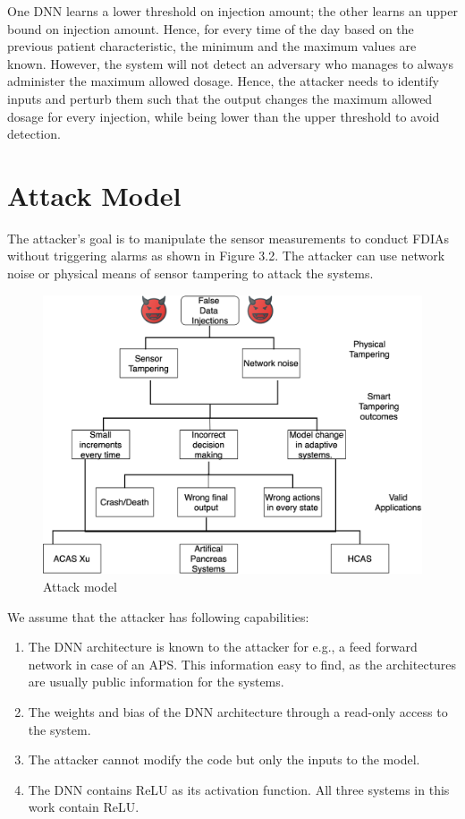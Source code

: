 One \ac{DNN} learns a lower threshold on injection amount; the other learns an upper bound on injection amount. 
Hence, for every time of the day based on the previous patient characteristic, the minimum and the maximum values are known. 
However, the system will not detect  an adversary  who manages to always administer the maximum allowed dosage.   
Hence, the attacker needs to identify inputs and  perturb them  such that the output changes the maximum  allowed dosage for every injection, 
  while being lower than the upper threshold to avoid detection. 


\section{Attack Model}
The attacker's goal is to manipulate the sensor measurements to conduct FDIAs without triggering alarms as shown in Figure 3.2. 
The attacker can use network noise or physical means of sensor tampering to attack the systems. 
 
\begin{figure}
	\centering
	\includegraphics[width=0.7\linewidth]{Images/Attackmodelphysical}
	\caption{Attack model}
	\label{fig:attackmodelphysical}
\end{figure}

We assume that the attacker has following capabilities:
\begin{enumerate}
	\item The \ac{DNN}  architecture  is known to the attacker for e.g., a feed forward  network in case of an \ac{APS}. This information easy to find, as the architectures are  usually public information for the systems. 
	\item  The weights and bias of the \ac{DNN}  architecture through a read-only access to the system.  
	\item The attacker cannot modify the code but only the inputs to the model.
	\item The \ac{DNN} contains ReLU as its activation function. 
	All three systems in this work contain ReLU.
\end{enumerate}

